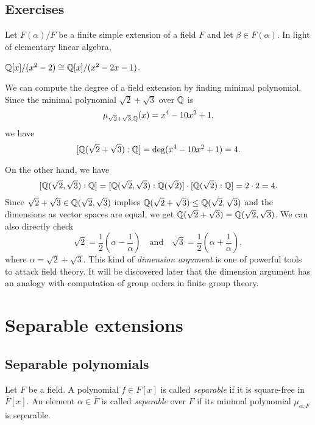 \documentclass{../note}
\begin{document}
\section*{Exercises}
\begin{prb}
Let $F(\alpha)/F$ be a finite simple extension of a field $F$ and let $\beta\in F(\alpha)$.
In light of elementary linear algebra,
\end{prb}

\begin{prb}
$\mathbb{Q}[x]/(x^2-2)\cong\mathbb{Q}[x]/(x^2-2x-1)$.
\end{prb}

\begin{prb}
We can compute the degree of a field extension by finding minimal polynomial.
Since the minimal polynomial $\sqrt2+\sqrt3$ over $\mathbb{Q}$ is
\[\mu_{\sqrt2+\sqrt3,\mathbb{Q}}(x)=x^4-10x^2+1,\]
we have
\[[\mathbb{Q}(\sqrt2+\sqrt3):\mathbb{Q}]=\deg(x^4-10x^2+1)=4.\]

On the other hand, we have
\[[\mathbb{Q}(\sqrt2,\sqrt3):\mathbb{Q}]=[\mathbb{Q}(\sqrt2,\sqrt3):\mathbb{Q}(\sqrt2)]\cdot[\mathbb{Q}(\sqrt2):\mathbb{Q}]=2\cdot2=4.\]
Since $\sqrt2+\sqrt3\in\mathbb{Q}(\sqrt2,\sqrt3)$ implies $\mathbb{Q}(\sqrt2+\sqrt3)\le\mathbb{Q}(\sqrt2,\sqrt3)$ and the dimensions as vector spaces are equal, we get $\mathbb{Q}(\sqrt2+\sqrt3)=\mathbb{Q}(\sqrt2,\sqrt3)$.
We can also directly check
\[\sqrt2=\frac12\left(\alpha-\frac1\alpha\right)\quad\text{and}\quad\sqrt3=\frac12\left(\alpha+\frac1\alpha\right),\]
where $\alpha=\sqrt2+\sqrt3$.
This kind of \emph{dimension argument} is one of powerful tools to attack field theory.
It will be discovered later that the dimension argument has an analogy with computation of group orders in finite group theory.
\end{prb}











\chapter{Separable extensions}

\section{Separable polynomials}
\begin{defn}
Let $F$ be a field.
A polynomial $f\in F[x]$ is called \emph{separable} if it is square-free in $\bar F[x]$.
An element $\alpha\in\bar F$ is called \emph{separable} over $F$ if its minimal polynomial $\mu_{\alpha,F}$ is separable.
\end{defn}
\end{document}
